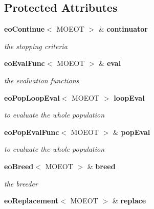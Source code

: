 \subsection*{Protected Attributes}
\begin{CompactItemize}
\item 
{\bf eo\-Continue}$<$ MOEOT $>$ \& {\bf continuator}\label{classmoeoEasyEA_5f5b76acbaf99a6a3ee2710da07dde29}

\begin{CompactList}\small\item\em the stopping criteria \item\end{CompactList}\item 
{\bf eo\-Eval\-Func}$<$ MOEOT $>$ \& {\bf eval}\label{classmoeoEasyEA_26e8ebce6a1bc3216e20171688ba6b83}

\begin{CompactList}\small\item\em the evaluation functions \item\end{CompactList}\item 
{\bf eo\-Pop\-Loop\-Eval}$<$ MOEOT $>$ {\bf loop\-Eval}\label{classmoeoEasyEA_c1d492090805bf322c07159a9238a7ae}

\begin{CompactList}\small\item\em to evaluate the whole population \item\end{CompactList}\item 
{\bf eo\-Pop\-Eval\-Func}$<$ MOEOT $>$ \& {\bf pop\-Eval}\label{classmoeoEasyEA_189a8f5196844907ff71f386d95bf415}

\begin{CompactList}\small\item\em to evaluate the whole population \item\end{CompactList}\item 
{\bf eo\-Breed}$<$ MOEOT $>$ \& {\bf breed}\label{classmoeoEasyEA_35d5909694019d1b0d52347c72a9092e}

\begin{CompactList}\small\item\em the breeder \item\end{CompactList}\item 
{\bf eo\-Replacement}$<$ MOEOT $>$ \& {\bf replace}\label{classmoeoEasyEA_1872664368d198f983d11a96f0ee3d8d}


\end{CompactItemize}
